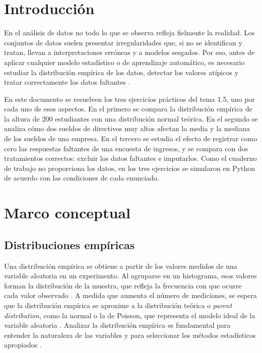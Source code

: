 \documentclass[11pt,letterpaper]{article}
\begin{document}
\portada
\indicegeneral


\section{Introducción}

En el análisis de datos no todo lo que se observa refleja fielmente la realidad. Los conjuntos de datos suelen presentar irregularidades que, si no se identifican y tratan, llevan a interpretaciones erróneas y a modelos sesgados. Por eso, antes de aplicar cualquier modelo estadístico o de aprendizaje automático, es necesario estudiar la distribución empírica de los datos, detectar los valores atípicos y tratar correctamente los datos faltantes \parencite{tecnm2026_documento_fuente}.

En este documento se resuelven los tres ejercicios prácticos del tema 1.5, uno por cada uno de esos aspectos. En el primero se compara la distribución empírica de la altura de 200 estudiantes con una distribución normal teórica. En el segundo se analiza cómo dos sueldos de directivos muy altos afectan la media y la mediana de los sueldos de una empresa. En el tercero se estudia el efecto de registrar como cero las respuestas faltantes de una encuesta de ingresos, y se compara con dos tratamientos correctos: excluir los datos faltantes e imputarlos. Como el cuaderno de trabajo no proporciona los datos, en los tres ejercicios se simularon en Python de acuerdo con las condiciones de cada enunciado.

\section{Marco conceptual}

\subsection{Distribuciones empíricas}

Una distribución empírica se obtiene a partir de los valores medidos de una variable aleatoria en un experimento. Al agruparse en un histograma, esos valores forman la distribución de la muestra, que refleja la frecuencia con que ocurre cada valor observado \parencite{tecnm2026_documento_fuente,bonamente2017}. A medida que aumenta el número de mediciones, se espera que la distribución empírica se aproxime a la distribución teórica o \textit{parent distribution}, como la normal o la de Poisson, que representa el modelo ideal de la variable aleatoria \parencite{bonamente2017}. Analizar la distribución empírica es fundamental para entender la naturaleza de las variables y para seleccionar los métodos estadísticos apropiados \parencite{tecnm2026_documento_fuente}.
\end{document}

